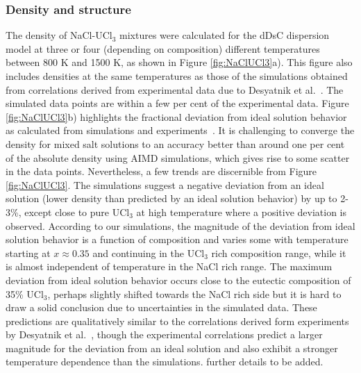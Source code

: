 \documentclass[preprint,3p,10pt,twocolumn,number,sort&compress]{elsarticle}
\begin{document}
\subsubsection{Density and structure}
The density of NaCl-UCl$_3$ mixtures were calculated for the dDsC dispersion model at three or four (depending on composition) different temperatures between 800 K and 1500 K, as shown in Figure \ref{fig:NaClUCl3}a). This figure also includes densities at the same temperatures as those of the simulations obtained from correlations derived from experimental data due to Desyatnik et al.~\cite{Desyatnik}. The simulated data points are within a few per cent of the experimental data.  %
Figure \ref{fig:NaClUCl3}b) highlights the fractional deviation from ideal solution behavior as calculated from simulations and experiments~\cite{Desyatnik}. 
It is challenging to converge the density for mixed salt solutions to an accuracy better than around one per cent of the absolute density using AIMD simulations, which gives rise to some scatter in the data points. 
Nevertheless, a few trends are discernible from Figure \ref{fig:NaClUCl3}. %
The simulations suggest a negative deviation from an ideal solution (lower density than predicted by an ideal solution behavior) by up to 2-3\%, except close to pure UCl$_3$ at high temperature where a positive deviation is observed. According to our simulations, the magnitude of the deviation from ideal solution behavior is a function of composition and varies some with temperature starting at $x\approx0.35$ and continuing in the UCl$_3$ rich composition range, while it is almost independent of temperature in the NaCl rich range. 
The maximum deviation from ideal solution behavior occurs close to the eutectic composition of 35\% UCl$_3$, perhaps slightly shifted towards the NaCl rich side but it is hard to draw a solid conclusion due to uncertainties in the simulated data. These predictions are qualitatively similar to the correlations derived form experiments by Desyatnik et al.~\cite{Desyatnik}, though the experimental correlations predict a larger magnitude for the deviation from an ideal solution and also exhibit a stronger temperature dependence than the simulations. {\color{red} further details to be added.} %
\end{document}
